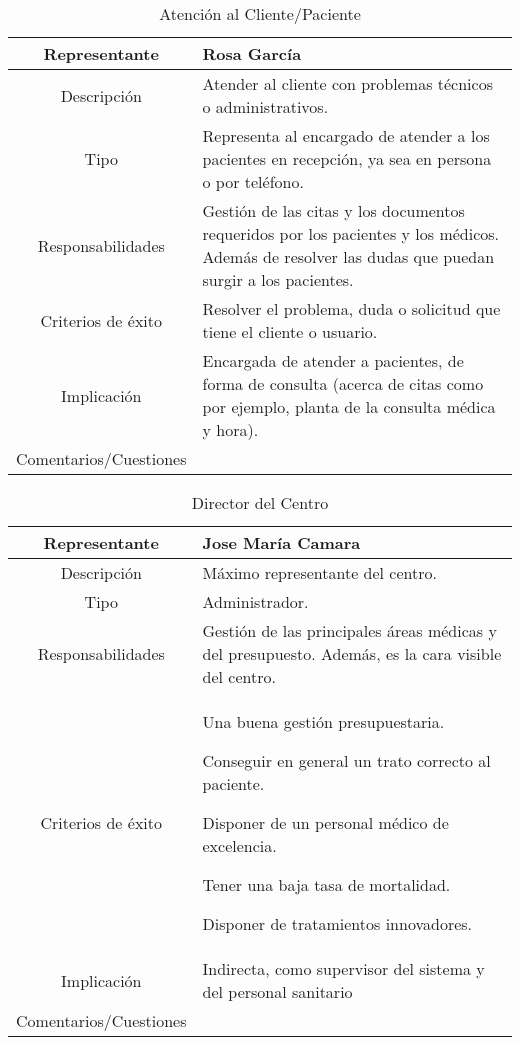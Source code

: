 \documentclass[12pt, spanish]{article}
\begin{document}
\begin{longtable}{|c|p{.65\linewidth}|}
   \caption{Atención al Cliente/Paciente} \\
   \hline
   Representante & Rosa García\\
   \hline
   Descripción & Atender al cliente con problemas técnicos o administrativos. \\
   \hline
   Tipo & Representa al encargado de atender a los pacientes en recepción, ya sea en persona o por teléfono.  \\
   \hline
   Responsabilidades & Gestión de las citas y los documentos requeridos por los pacientes y los médicos. Además de resolver las dudas que puedan surgir a los pacientes. \\
   \hline
   Criterios de éxito & Resolver el problema, duda o solicitud que tiene el cliente o usuario. \\
   \hline
   Implicación & Encargada de atender a pacientes, de forma de consulta (acerca de citas como por ejemplo, planta de la consulta médica y hora). \\
   \hline
   Comentarios/Cuestiones & \\
   \hline
\end{longtable}

\begin{longtable}{|c|p{.65\linewidth}|}
   \caption{Director del Centro} \\
   \hline
   Representante & Jose María Camara\\
   \hline
   Descripción & Máximo representante del centro.\\
   \hline
   Tipo & Administrador.  \\
   \hline
   Responsabilidades & Gestión de las principales áreas médicas y del presupuesto. Además, es la cara visible del centro. \\
   \hline
   Criterios de éxito & Una buena gestión presupuestaria.

   Conseguir en general un trato correcto al paciente.

   Disponer de un personal médico de excelencia.

   Tener una baja tasa de mortalidad.

   Disponer de tratamientos innovadores. \\
   \hline
   Implicación & Indirecta, como supervisor del sistema y del personal sanitario \\
   \hline
   Comentarios/Cuestiones & \\
   \hline
\end{longtable}
\end{document}
